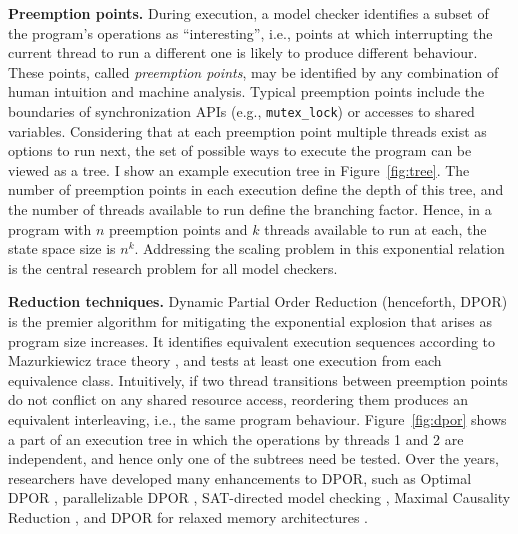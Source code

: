 {\bf Preemption points.}
During execution, a model checker identifies a subset of the program's operations as ``interesting'', i.e.,
points at which interrupting the current thread to run a different one is likely to produce different behaviour.
These points, called {\em preemption points}, may be identified by any combination of human intuition and machine analysis.
Typical preemption points include the boundaries of synchronization APIs (e.g., {\tt mutex\_lock}) or accesses to shared variables.
Considering that at each preemption point multiple threads exist as options to run next, the set of possible ways to execute the program can be viewed as a tree.
I show an example execution tree in Figure~\ref{fig:tree}.
The number of preemption points in each execution define the depth of this tree, and the number of threads available to run define the branching factor.
Hence, in a program with $n$ preemption points and $k$ threads available to run at each, the state space size is $n^k$.
Addressing the scaling problem in this exponential relation is the central research problem for all model checkers.

{\bf Reduction techniques.}
Dynamic Partial Order Reduction \cite{dpor} (henceforth, DPOR) is the premier algorithm for mitigating the exponential explosion that arises as program size increases.
It identifies equivalent execution sequences according to Mazurkiewicz trace theory \cite{mazurkiewicz},
and tests at least one execution from each equivalence class.
Intuitively, if two thread transitions between preemption points do not conflict on any shared resource access, reordering them produces an equivalent interleaving, i.e., the same program behaviour.
Figure~\ref{fig:dpor} shows a part of an execution tree in which the operations by threads 1 and 2 are independent, and hence only one of the subtrees need be tested.
Over the years, researchers have developed many enhancements to DPOR, such as Optimal DPOR \cite{optimal-dpor}, parallelizable DPOR \cite{parallel-dpor}, SAT-directed model checking \cite{satcheck}, Maximal Causality Reduction \cite{mcr}, and DPOR for relaxed memory architectures \cite{tsopso}.

